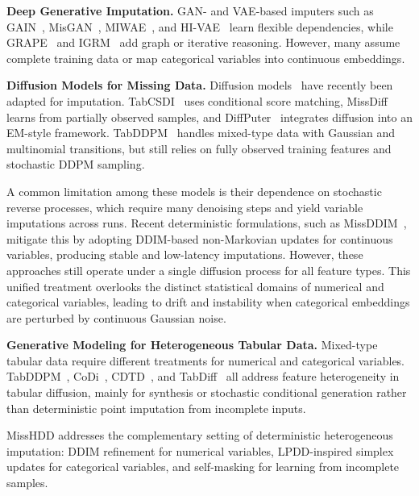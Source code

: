 \documentclass[times, review, 10pt]{elsarticle}
\newcommand{\DIFaddbegin}{\begingroup\color{blue}}
\newcommand{\DIFaddend}{\endgroup}
\begin{document}
\textbf{Deep Generative Imputation.}
\DIFaddbegin
GAN- and VAE-based imputers such as GAIN~\cite{yoon2018gain},
MisGAN~\cite{misGAN}, MIWAE~\cite{mattei2019miwae}, and HI-VAE~\cite{hivae}
learn flexible dependencies, while GRAPE~\cite{grape} and IGRM~\cite{igrm}
add graph or iterative reasoning. However, many assume complete training data
or map categorical variables into continuous embeddings.
\DIFaddend

\textbf{Diffusion Models for Missing Data.}
\DIFaddbegin
Diffusion models~\cite{dm1,chang2025design,dreview1} have recently been
adapted for imputation. TabCSDI~\cite{tabcsdi} uses conditional score matching,
MissDiff~\cite{missdiff} learns from partially observed samples, and
DiffPuter~\cite{diffputer} integrates diffusion into an EM-style framework.
TabDDPM~\cite{tabddpm} handles mixed-type data with Gaussian and multinomial
transitions, but still relies on fully observed training features and
stochastic DDPM sampling.
\DIFaddend

A common limitation among these models is their dependence on stochastic reverse processes, which require many denoising steps and yield variable imputations across runs. Recent deterministic formulations, such as MissDDIM~\cite{missddim}, mitigate this by adopting DDIM-based non-Markovian updates for continuous variables, producing stable and low-latency imputations. However, these approaches still operate under a single diffusion process for all feature types. This unified treatment overlooks the distinct statistical domains of numerical and categorical variables, leading to drift and instability when categorical embeddings are perturbed by continuous Gaussian noise.



\textbf{Generative Modeling for Heterogeneous Tabular Data.}
\DIFaddbegin
Mixed-type tabular data require different treatments for numerical and
categorical variables. TabDDPM~\cite{tabddpm}, CoDi~\cite{codi},
CDTD~\cite{cdtd}, and TabDiff~\cite{tabdiff} all address feature heterogeneity
in tabular diffusion, mainly for synthesis or stochastic conditional
generation rather than deterministic point imputation from incomplete inputs.
\DIFaddend

\DIFaddbegin
MissHDD addresses the complementary setting of deterministic heterogeneous
imputation: DDIM refinement for numerical variables, LPDD-inspired simplex
updates for categorical variables, and self-masking for learning from
incomplete samples.
\DIFaddend
\end{document}

